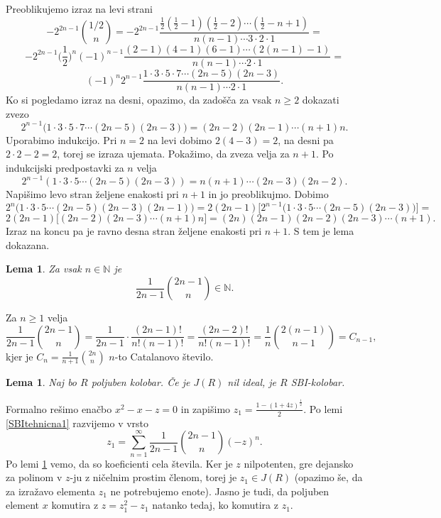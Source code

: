 \documentclass[a4paper, 12pt]{amsart}
\theoremstyle{definition} %
\theoremstyle{plain} %
\newtheorem{lema}[definicija]{Lema}
\newcommand{\N}{\mathbb N}
\begin{document}
Preoblikujemo izraz na levi strani
$$
-2^{2n-1} {1/2 \choose n} = -2^{2n-1} \frac{\frac{1}{2}(\frac{1}{2}-1)(\frac{1}{2} - 2)\cdots(\frac{1}{2} - n+1) }{n(n-1)\cdots 3 \cdot 2 \cdot 1} =
$$
$$
-2^{2n-1}\big(\frac{1}{2}\big)^n (-1)^{n-1} \frac{(2-1)(4-1)(6-1)\cdots (2(n-1)-1)}{n(n-1)\cdots 2 \cdot1} = 
$$
$$
(-1)^n 2^{n-1} \frac{1\cdot 3 \cdot 5 \cdot 7 \cdots (2n-5)(2n-3)}{n(n-1)\cdots 2\cdot1}.
$$
Ko si pogledamo izraz na desni, opazimo, da zadošča za vsak $n\ge 2$ dokazati zvezo
$$
2^{n-1}\big( 1\cdot 3 \cdot 5 \cdot 7 \cdots(2n-5)(2n-3)   \big) = (2n-2) (2n-1) \cdots (n+1) n.
$$
Uporabimo indukcijo. Pri $n=2$ na levi dobimo $2(4-3) = 2$, na desni pa $2\cdot 2 - 2 = 2$, torej se izraza ujemata. Pokažimo, da zveza velja za $n+1$. Po indukcijski predpostavki za $n$ velja 
$$
2^{n-1} (1\cdot 3\cdot 5 \cdots (2n-5)(2n-3)) = n(n+1)\cdots (2n-3)(2n-2).
$$
Napišimo levo stran željene enakosti pri $n+1$ in jo preoblikujmo. Dobimo
$$
2^n \big(1\cdot 3 \cdot 5 \cdots (2n-5)(2n-3)(2n-1)\big) = 2(2n-1) \big[2^{n-1}\big(1\cdot 3 \cdot 5 \cdots (2n-5)(2n-3) \big)\big]=
$$
$$
2(2n-1) \big[(2n-2)(2n-3)\cdots(n+1)n\big] = (2n)(2n-1)(2n-2)(2n-3)\cdots (n+1).
$$
Izraz na koncu pa je ravno desna stran željene enakosti pri $n+1$. S tem je lema dokazana.
\endproof

\begin{lema}
\label{SBItehnicna2}
Za vsak $n\in \N$ je 
$$
\frac{1}{2n-1} {2n-1 \choose n} \in \N.
$$
\end{lema}

\proof
Za $n\ge 1$ velja 
$$
\frac{1}{2n-1} {2n-1 \choose n} = \frac{1}{2n-1}\cdot\frac{(2n-1)!}{n! (n-1)!} = \frac{(2n-2)!}{n!(n-1)!} = \frac{1}{n} {2(n-1) \choose n-1} = C_{n-1},
$$
kjer je $C_n = \frac{1}{n+1}{2n \choose n}$ $n$-to Catalanovo število. 
\endproof

\begin{lema}
\label{nilJeSBI}
Naj bo $R$ poljuben kolobar. Če je $J(R)$ nil ideal, je $R$ SBI-kolobar.
\end{lema}

\proof
Formalno rešimo enačbo $x^2 - x - z = 0$ in zapišimo $z_1 = \frac{1-(1+4z)^{\frac{1}{2}}}{2}$. Po lemi \ref{SBItehnicna1} razvijemo v vrsto
$$
z_1 = \sum_{n=1}^{\infty} \frac{1}{2n-1} \binom{2n-1}{n}(-z)^n.
$$
Po lemi \ref{SBItehnicna2} vemo, da so koeficienti cela števila. Ker je $z$ nilpotenten, gre dejansko za polinom v $z$-ju z ničelnim prostim členom, torej je $z_1 \in J(R)$ (opazimo še, da za izražavo elementa $z_1$ ne potrebujemo enote). Jasno je tudi, da poljuben element $x$ komutira z $z=z_1^2 - z_1$ natanko tedaj, ko komutira z $z_1$.
\endproof
\end{document}
